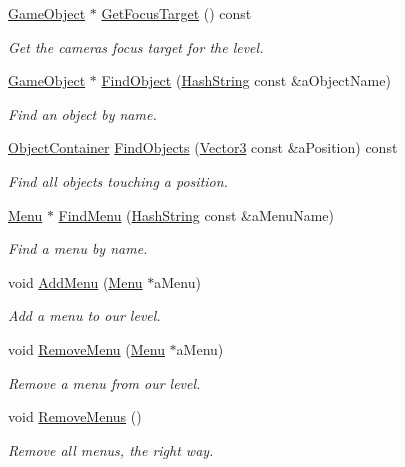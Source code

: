 \begin{DoxyCompactItemize}
\hyperlink{classGameObject}{Game\+Object} $\ast$ \hyperlink{classLevel_a2ad4ee076cc4ebf9a349fdc3af493af7}{Get\+Focus\+Target} () const 
\begin{DoxyCompactList}\small\item\em Get the camera\textquotesingle{}s focus target for the level. \end{DoxyCompactList}\item 
\hyperlink{classGameObject}{Game\+Object} $\ast$ \hyperlink{classLevel_a8c58a8e52809a6dba6e698f12df3b4b5}{Find\+Object} (\hyperlink{classHashString}{Hash\+String} const \&a\+Object\+Name)
\begin{DoxyCompactList}\small\item\em Find an object by name. \end{DoxyCompactList}\item 
\hyperlink{classLevel_afd39ad8a5d9272ab8e14853e0fb18a48}{Object\+Container} \hyperlink{classLevel_a7d03525a6fe7635d2260097907c0707c}{Find\+Objects} (\hyperlink{structVector3}{Vector3} const \&a\+Position) const 
\begin{DoxyCompactList}\small\item\em Find all objects touching a position. \end{DoxyCompactList}\item 
\hyperlink{classMenu}{Menu} $\ast$ \hyperlink{classLevel_a94fee75209377d73e1ffee8b975ca447}{Find\+Menu} (\hyperlink{classHashString}{Hash\+String} const \&a\+Menu\+Name)
\begin{DoxyCompactList}\small\item\em Find a menu by name. \end{DoxyCompactList}\item 
void \hyperlink{classLevel_aa7d5306d7e7e44abbe377e9d4f76ec23}{Add\+Menu} (\hyperlink{classMenu}{Menu} $\ast$a\+Menu)
\begin{DoxyCompactList}\small\item\em Add a menu to our level. \end{DoxyCompactList}\item 
void \hyperlink{classLevel_ac0d5c2f55beca4aa790e628ab54d57aa}{Remove\+Menu} (\hyperlink{classMenu}{Menu} $\ast$a\+Menu)
\begin{DoxyCompactList}\small\item\em Remove a menu from our level. \end{DoxyCompactList}\item 
void \hyperlink{classLevel_a6215db30022670f866047ee7a4c449bb}{Remove\+Menus} ()
\begin{DoxyCompactList}\small\item\em Remove all menus, the right way. \end{DoxyCompactList}\item 

\end{DoxyCompactItemize}
